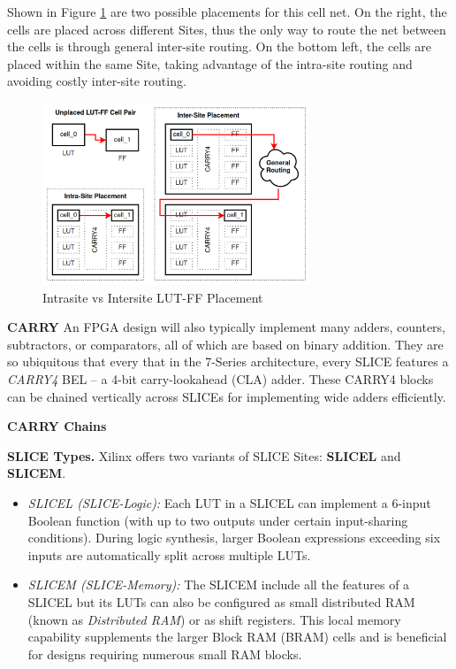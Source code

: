 \documentclass[twocolumn]{article}
\begin{document}
        Shown in Figure \ref{fig:intersite_intrasite} are two possible placements for this cell net. 
        On the right, the cells are placed across different Sites, thus the only way to route the net between the cells is through general inter-site routing. 
        On the bottom left, the cells are placed within the same Site, taking advantage of the intra-site routing and avoiding costly inter-site routing. 

        \begin{figure}[]
            \centering
            \includegraphics[width=8.0cm]{figures/intersite_intrasite_2.png}
            \caption{Intrasite vs Intersite LUT-FF Placement}
            \label{fig:intersite_intrasite}
        \end{figure}


    \textbf{CARRY} \quad
        An FPGA design will also typically implement many adders, counters, subtractors, or comparators, all of which are based on binary addition. 
        They are so ubiquitous that every that in the 7-Series architecture, every SLICE features a \emph{CARRY4} BEL -- a 4-bit carry-lookahead (CLA) adder. 
        These CARRY4 blocks can be chained vertically across SLICEs for implementing wide adders efficiently. 

    \textbf{CARRY Chains} \quad



    \textbf{SLICE Types.}\quad 
    Xilinx offers two variants of SLICE Sites: \textbf{SLICEL} and \textbf{SLICEM}.  
    \begin{itemize}
        \item \emph{SLICEL (SLICE-Logic):} Each LUT in a SLICEL can implement a 6-input Boolean function (with up to two outputs under certain input-sharing conditions). During logic synthesis, larger Boolean expressions exceeding six inputs are automatically split across multiple LUTs.
        \item \emph{SLICEM (SLICE-Memory):} The SLICEM include all the features of a SLICEL but its LUTs can also be configured as small distributed RAM (known as \emph{Distributed RAM}) or as shift registers. This local memory capability supplements the larger Block RAM (BRAM) cells and is beneficial for designs requiring numerous small RAM blocks.
    \end{itemize}
\end{document}
